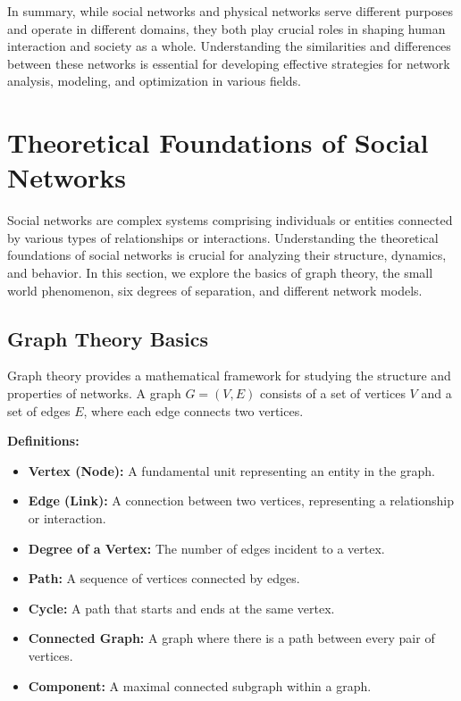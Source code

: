 \documentclass[12pt]{book} %
\begin{document}
In summary, while social networks and physical networks serve different purposes and operate in different domains, they both play crucial roles in shaping human interaction and society as a whole. Understanding the similarities and differences between these networks is essential for developing effective strategies for network analysis, modeling, and optimization in various fields.


\section{Theoretical Foundations of Social Networks}

Social networks are complex systems comprising individuals or entities connected by various types of relationships or interactions. Understanding the theoretical foundations of social networks is crucial for analyzing their structure, dynamics, and behavior. In this section, we explore the basics of graph theory, the small world phenomenon, six degrees of separation, and different network models.

\subsection{Graph Theory Basics}

Graph theory provides a mathematical framework for studying the structure and properties of networks. A graph \( G = (V, E) \) consists of a set of vertices \( V \) and a set of edges \( E \), where each edge connects two vertices. 

\textbf{Definitions:}
\begin{itemize}
    \item \textbf{Vertex (Node):} A fundamental unit representing an entity in the graph.
    \item \textbf{Edge (Link):} A connection between two vertices, representing a relationship or interaction.
    \item \textbf{Degree of a Vertex:} The number of edges incident to a vertex.
    \item \textbf{Path:} A sequence of vertices connected by edges.
    \item \textbf{Cycle:} A path that starts and ends at the same vertex.
    \item \textbf{Connected Graph:} A graph where there is a path between every pair of vertices.
    \item \textbf{Component:} A maximal connected subgraph within a graph.
\end{itemize}
\end{document}
